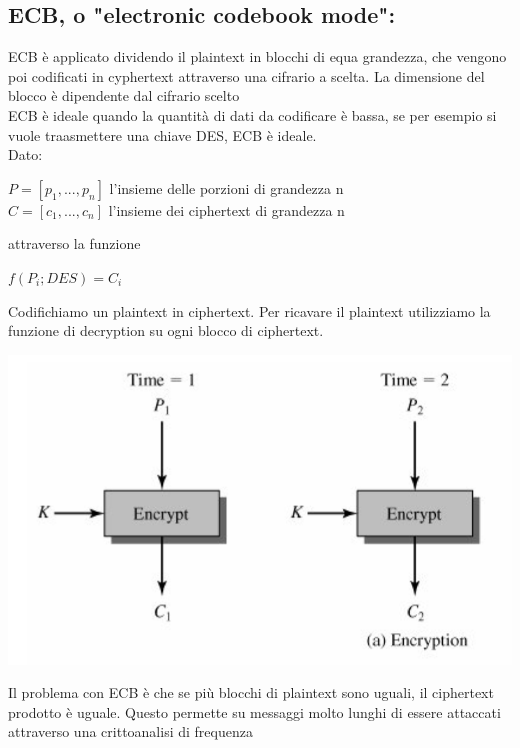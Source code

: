 \documentclass[11pt, oneside]{article}   	%
\begin{document}
\subsection*{ECB, o "electronic codebook mode":}
ECB è applicato dividendo il plaintext in blocchi di equa grandezza, che vengono poi codificati in cyphertext attraverso una cifrario a scelta. La dimensione del blocco è dipendente dal cifrario scelto\\
ECB è ideale quando la quantità di dati da codificare è bassa, se per esempio si vuole traasmettere una chiave DES, ECB è ideale.\\
Dato: \begin{center}
$P = [p_1, ..., p_n]$ l'insieme delle porzioni di grandezza n\\
$C = [c_1, ..., c_n]$ l'insieme dei ciphertext di grandezza n
\end{center}
attraverso la funzione
\begin{center}$f(P_i; DES) = C_i$ 
\end{center}
Codifichiamo un plaintext in ciphertext. Per ricavare il plaintext utilizziamo la funzione di decryption su ogni blocco di ciphertext.
\begin{center}
\includegraphics[scale= 0.7]{ecb}
\end{center}
Il problema con ECB è che se più blocchi di plaintext sono uguali, il ciphertext prodotto è uguale. Questo permette su messaggi molto lunghi di essere attaccati attraverso una crittoanalisi di frequenza
\end{document}
